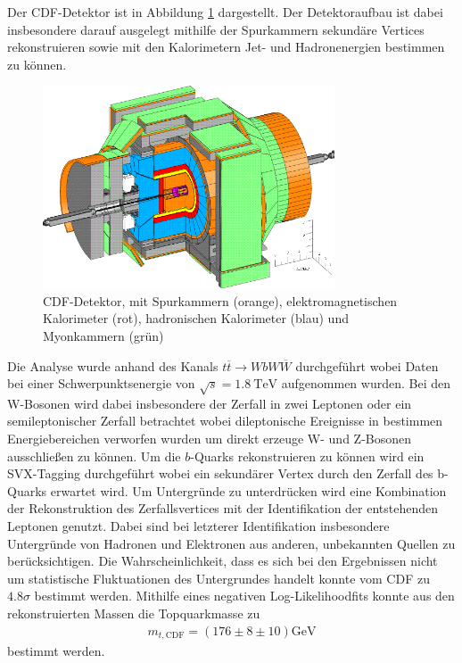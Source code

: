 Der CDF-Detektor ist in Abbildung \ref{fig:cdf} dargestellt.
Der Detektoraufbau ist dabei insbesondere darauf ausgelegt mithilfe der Spurkammern sekundäre Vertices rekonstruieren  sowie mit den Kalorimetern Jet- und Hadronenergien bestimmen zu können.
\begin{figure}
  \centering
  \includegraphics[height=6.0cm]{ressources/cdfii_3d_p1.png}
  \caption{CDF-Detektor, mit Spurkammern (orange), elektromagnetischen Kalorimeter (rot), hadronischen Kalorimeter (blau) und Myonkammern (grün) \cite{Galtieri:2011yd}}
  \label{fig:cdf}
\end{figure}
Die Analyse wurde anhand des Kanals $t \overline{t} \rightarrow W b W \overline{W}$ durchgeführt wobei Daten bei einer Schwerpunktsenergie von $\sqrt{s} = \SI{1.8}{\tera\electronvolt}$ aufgenommen wurden.
Bei den W-Bosonen wird dabei insbesondere der Zerfall in zwei Leptonen oder ein semileptonischer Zerfall betrachtet wobei dileptonische Ereignisse in bestimmen Energiebereichen verworfen wurden um direkt erzeuge W- und Z-Bosonen ausschließen zu können.
Um die $b$-Quarks rekonstruieren zu können wird ein SVX-Tagging durchgeführt wobei ein sekundärer Vertex durch den Zerfall des b-Quarks erwartet wird.
Um Untergründe zu unterdrücken wird eine Kombination der Rekonstruktion des Zerfallsvertices mit der Identifikation der entstehenden Leptonen genutzt.
Dabei sind bei letzterer Identifikation insbesondere Untergründe von Hadronen und Elektronen aus anderen, unbekannten Quellen zu berücksichtigen.
Die Wahrscheinlichkeit, dass es sich bei den Ergebnissen nicht um statistische Fluktuationen des Untergrundes handelt konnte vom CDF zu $\num{4.8}\sigma$ bestimmt werden.
Mithilfe eines negativen Log-Likelihoodfits konnte aus den rekonstruierten Massen die Topquarkmasse zu 
\begin{align*}
	m_{t, \text{CDF}} = \left( \num{176} \pm \num{8} \pm \num{10} \right) \si{\giga\electronvolt}
\end{align*}
bestimmt werden.

